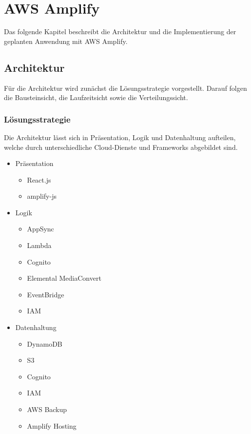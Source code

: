 \chapter{AWS Amplify}

Das folgende Kapitel beschreibt die Architektur und die Implementierung der geplanten Anwendung mit AWS Amplify.

\section{Architektur}

Für die Architektur wird zunächst die Lösungsstrategie vorgestellt. Darauf folgen die Bausteinsicht, die Laufzeitsicht sowie die Verteilungssicht.

\subsection{Lösungsstrategie}

Die Architektur lässt sich in Präsentation, Logik und Datenhaltung aufteilen, welche durch unterschiedliche Cloud-Dienste und Frameworks abgebildet sind.
\begin{itemize}
  \item Präsentation
    \begin{itemize}
      \item React.js
      \item amplify-js
    \end{itemize}
  \item Logik
    \begin{itemize}
      \item AppSync
      \item Lambda
      \item Cognito
      \item Elemental MediaConvert
      \item EventBridge
      \item IAM
    \end{itemize}
  \item Datenhaltung
    \begin{itemize}
      \item DynamoDB
      \item S3
      \item Cognito
      \item IAM
      \item AWS Backup
      \item Amplify Hosting
    \end{itemize}
\end{itemize}

